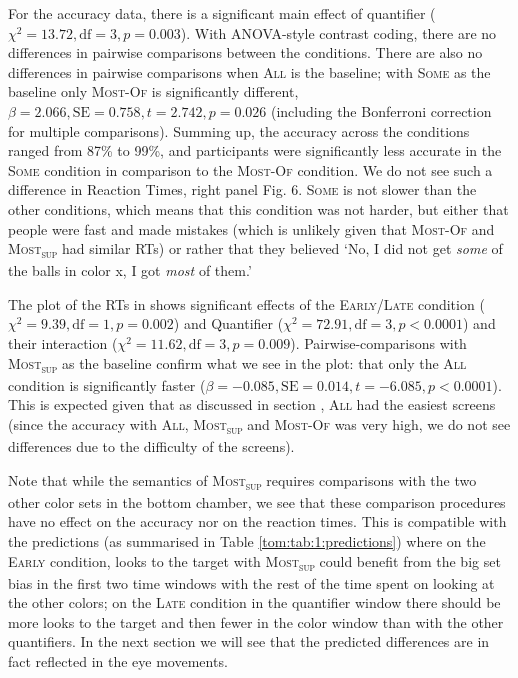 \documentclass[output=paper]{langscibook}
\begin{document}
For the accuracy data, there is a significant main effect of quantifier ($\chi ^2=13.72, \text{df}=3,
p=0.003$). With ANOVA-style contrast coding, there are no differences in pairwise comparisons between the
conditions. There are also no differences in pairwise comparisons when \textsc{All} is the baseline; with \textsc{Some}\textit{ }as the baseline only \textsc{Most-Of} is significantly different, $\beta =2.066, \text{SE}=0.758, t=2.742, p=0.026$ (including the Bonferroni correction for multiple comparisons). Summing up, the accuracy across the conditions ranged from 87\% to 99\%, and participants were significantly less accurate in the \textsc{Some} condition in comparison to the \textsc{Most-Of} condition. We do not see such a difference in Reaction Times, right panel Fig. 6. \textsc{Some} is not slower than the other conditions, which means that
this condition was not harder, but either that people were fast and made mistakes (which is unlikely given that
\textsc{Most-Of} and \textsc{Most\textsubscript{sup}} had similar RTs) or rather that they believed ‘No, I did
not get \textit{some} of the balls in color x, I got \textit{most} of them.’

The plot of the RTs in  shows significant effects of the \textsc{Early}/\textsc{Late} condition ($\chi^2=9.39,
\text{df}=1, p=0.002$) and Quantifier ($\chi^2=72.91, \text{df}=3, p<0.0001$) and their
interaction ($\chi^2=11.62, \text{df}=3, p=0.009$). Pairwise-comparisons with
\textsc{Most\textsubscript{sup}} as the baseline confirm what we see in the plot: that only the \textsc{All}
condition is significantly faster ($\beta =-0.085, \text{SE}=0.014, t=-6.085, p<0.0001$). This is
expected given that as discussed in section , \textsc{All} had the easiest screens (since the accuracy with
\textsc{All}, \textsc{Most\textsubscript{sup}} and \textsc{Most-Of} was very high, we do not see differences due to the difficulty of the screens).

Note that while the semantics of \textsc{Most\textsubscript{sup}} requires comparisons with the two other color sets in the bottom chamber, we see that these comparison procedures have no effect on the accuracy nor on the reaction times. This is compatible with the predictions (as summarised in Table \ref{tom:tab:1:predictions}) where on the \textsc{Early} condition, looks to the
target with \textsc{Most\textsubscript{sup}} could benefit from the big set bias in the first two time windows
with the rest of the time spent on looking at the other colors; on the \textsc{Late} condition in the quantifier window there
should be more looks to the target and then fewer in the color window than with the other quantifiers. In the next
section we will see that the predicted differences are in fact reflected in the eye movements.
\end{document}
